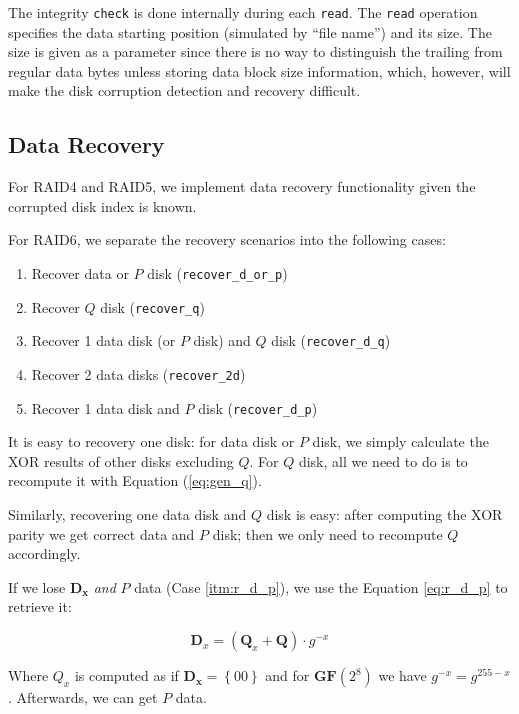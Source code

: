 The integrity \verb|check| is done internally during each \verb|read|. The \verb|read| operation specifies the data starting position (simulated by ``file name'') and its size. The size is given as a parameter since there is no way to distinguish the trailing from regular data bytes unless storing data block size information, which, however, will make the disk corruption detection and recovery difficult.

\subsection{Data Recovery}

For RAID4 and RAID5, we implement data recovery functionality given the corrupted disk index is known. 

For RAID6, we separate the recovery scenarios into the following cases:

\begin{enumerate}
	\item\label{itm:r_d_OR_p} Recover data or $P$ disk (\verb|recover_d_or_p|)
	\item \label{itm:r_q} Recover $Q$ disk (\verb|recover_q|)
	\item \label{itm:r_d_q} Recover 1 data disk (or $P$ disk) and $Q$ disk (\verb|recover_d_q|)
	\item \label{itm:r_2d} Recover 2 data disks (\verb|recover_2d|)
	\item \label{itm:r_d_p} Recover 1 data disk and $P$ disk (\verb|recover_d_p|)
\end{enumerate}

It is easy to recovery one disk: for data disk or $P$ disk, we simply calculate the XOR results of other disks excluding $Q$. For $Q$ disk, all we need to do is to recompute it with Equation (\ref{eq:gen_q}).

Similarly, recovering one data disk and $Q$ disk is easy: after computing the XOR parity we get correct data and $P$ disk; then we only need to recompute $Q$ accordingly.

If we lose $\mathbf{D_x}$ \emph{and} $P$ data (Case \ref{itm:r_d_p}), we use the Equation \ref{eq:r_d_p} to retrieve it:

\begin{equation}\label{eq:r_d_p}
	\mathbf{D}_x = (\mathbf{Q}_x+\mathbf{Q})\cdot g^{-x}
\end{equation}

Where $\mathbf{}Q_x$ is computed as if $\mathbf{D_x}=\left\{00\right\}$ and for $\mathbf{GF}(2^8)$ we have $g^{-x}=g^{255-x}$. Afterwards, we can get $P$ data.

